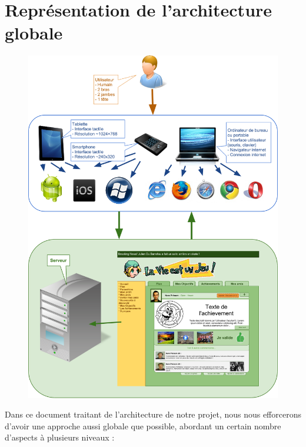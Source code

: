 \documentclass{life-fr}
\begin{document}

\chapter{Représentation de l’architecture globale}

\begin{figure}[H]
  \begin{center}
    \includegraphics[width=11.5cm]{img/intro.png}
  \end{center}
\end{figure}

\newpage

  Dans ce document traitant de l'architecture de notre projet, nous nous efforcerons d'avoir une approche aussi globale que possible, abordant un certain nombre d’aspects à plusieurs niveaux :
\end{document}
